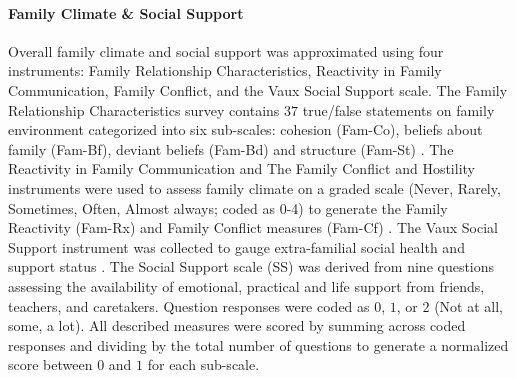 \documentclass[utf8]{article}
\begin{document}
\paragraph{Family Climate \& Social Support}
Overall family climate and social support was approximated using four instruments: Family Relationship Characteristics, Reactivity in Family Communication, Family Conflict, and the Vaux Social Support scale. The Family Relationship Characteristics survey contains $37$ true/false statements on family environment categorized into six sub-scales: cohesion (Fam-Co), beliefs about family (Fam-Bf), deviant beliefs (Fam-Bd) and structure (Fam-St) \citep{tolan1997assessment}. The Reactivity in Family Communication and The Family Conflict and Hostility instruments were used to assess family climate on a graded scale (Never, Rarely, Sometimes, Often, Almost always; coded as 0-4) to generate the Family Reactivity (Fam-Rx) and Family Conflict measures (Fam-Cf) \citep{thornberry2003gangs,henry2004study}. The Vaux Social Support instrument was collected to gauge extra-familial social health and support status \citep{vaux1988social}. The Social Support scale (SS) was derived from nine questions assessing the availability of emotional, practical and life support from friends, teachers, and caretakers. Question responses were coded as $0$, $1$, or $2$ (Not at all, some, a lot). All described measures were scored by summing across coded responses and dividing by the total number of questions to generate a normalized score between $0$ and $1$ for each sub-scale.
\end{document}

